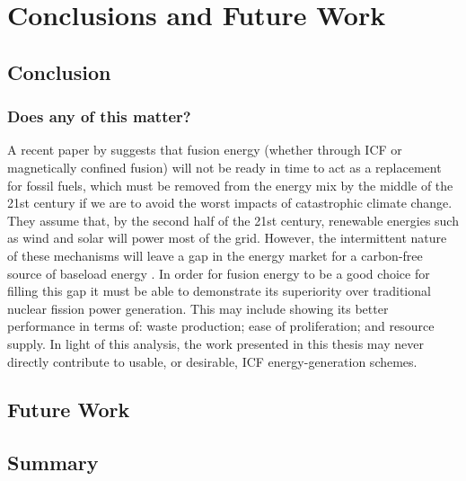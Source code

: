 \chapter{Conclusions and Future Work}
\label{chp:conclusion}

\section{Conclusion}


\subsection{Does any of this matter?}

A recent paper by \citet{Nicholas2021} suggests that fusion energy (whether through ICF or magnetically confined fusion) will not be ready in time to act as a replacement for fossil fuels, which must be removed from the energy mix by the middle of the 21st century if we are to avoid the worst impacts of catastrophic climate change. They assume that, by the second half of the 21st century, renewable energies such as wind and solar will power most of the grid. However, the intermittent nature of these mechanisms will leave a gap in the energy market for a carbon-free source of baseload energy \citep{Nicholas2021}. In order for fusion energy to be a good choice for filling this gap it must be able to demonstrate its superiority over traditional nuclear fission power generation. This may include showing its better performance in terms of: waste production; ease of proliferation; and resource supply. In light of this analysis, the work presented in this thesis may never directly contribute to usable, or desirable, ICF energy-generation schemes.

\section{Future Work}
\label{sec:future-work}

\section{Summary}
